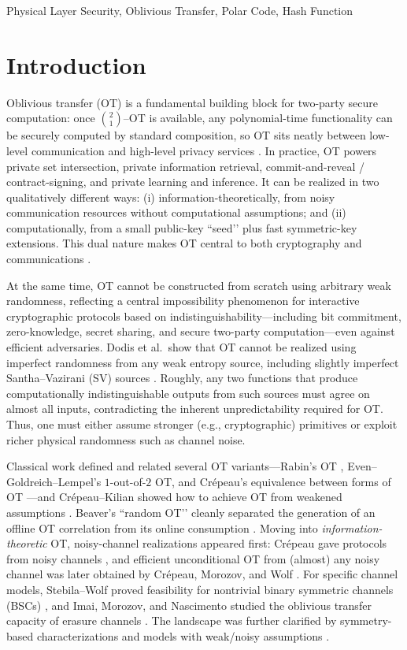 \documentclass[onecolumn]{IEEEtran} %
\newcommand{\1}{\mathbbm{1}}
\theoremstyle{boldremark}
\begin{document}
\begin{IEEEkeywords}
Physical Layer Security, Oblivious Transfer, Polar Code, Hash Function
\end{IEEEkeywords}
\section{Introduction}
Oblivious transfer (OT) is a fundamental building block for two-party secure computation: once $\binom{2}{1}$--OT is available, any polynomial-time functionality can be securely computed by standard composition, so OT sits neatly between low-level communication and high-level privacy services \cite{Kilian88,CrepeauKilian88}. In practice, OT powers private set intersection, private information retrieval, commit-and-reveal / contract-signing, and private learning and inference. It can be realized in two qualitatively different ways: (i) information-theoretically, from noisy communication resources without computational assumptions; and (ii) computationally, from a small public-key “seed’’ plus fast symmetric-key extensions. This dual nature makes OT central to both cryptography and communications \cite{Beaver95,NascimentoWinter2008}.

At the same time, OT cannot be constructed from scratch using arbitrary weak randomness, reflecting a central impossibility phenomenon for interactive cryptographic protocols based on indistinguishability---including bit commitment, zero-knowledge, secret sharing, and secure two-party computation---even against efficient adversaries. Dodis et al.\ show that OT cannot be realized using imperfect randomness from any weak entropy source, including slightly imperfect Santha--Vazirani (SV) sources \cite{DodisOngPrabhakaranSahai04,SanthaVazirani86}. Roughly, any two functions that produce computationally indistinguishable outputs from such sources must agree on almost all inputs, contradicting the inherent unpredictability required for OT. Thus, one must either assume stronger (e.g., cryptographic) primitives or exploit richer physical randomness such as channel noise.

Classical work defined and related several OT variants---Rabin’s OT \cite{Rabin81}, Even--Goldreich--Lempel’s $1$-out-of-$2$ OT, and Cr{\'e}peau’s equivalence between forms of OT \cite{EGL85,Crepeau87}---and Cr{\'e}peau--Kilian showed how to achieve OT from weakened assumptions \cite{CrepeauKilian88}. Beaver’s “random OT’’ cleanly separated the generation of an offline OT correlation from its online consumption \cite{Beaver95}. Moving into \emph{information-theoretic} OT, noisy-channel realizations appeared first: Cr{\'e}peau gave protocols from noisy channels \cite{Crepeau1997Noisy}, and efficient unconditional OT from (almost) any noisy channel was later obtained by Cr{\'e}peau, Morozov, and Wolf \cite{CrepeauMorozovWolf2005}. For specific channel models, Stebila--Wolf proved feasibility for nontrivial binary symmetric channels (BSCs) \cite{StebilaWolf2002ISIT}, and Imai, Morozov, and Nascimento studied the oblivious transfer capacity of erasure channels \cite{ImaiMorozovNascimento2006}. The landscape was further clarified by symmetry-based characterizations \cite{WolfWullschleger2006Symmetric} and models with weak/noisy assumptions \cite{Wullschleger2009TCC}.
\end{document}
